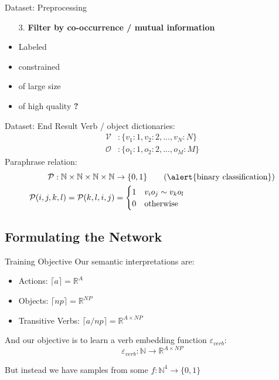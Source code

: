 \documentclass{beamer}
\begin{document}
\begin{frame}{Dataset: Preprocessing}

	\begin{enumerate}
	\item[3.] \textbf{Filter by co-occurrence / mutual information}
	\end{enumerate}

	\begin{itemize}
	\item Labeled \textcolor{Yes}{\checkmark}
	\item constrained \textcolor{Yes}{\checkmark}
	\item of large size \textcolor{Yes}{\checkmark}
	\item of high quality \textcolor{Maybe}{\textbf{?}}
	\end{itemize}
\end{frame}
    
\begin{frame}{Dataset: End Result}
	Verb / object dictionaries:
	\begin{align*}
	\mathcal{V}&: \{v_1: 1, v_2: 2, ..., v_N: N\}\\
	\mathcal{O}&: \{o_1: 1, o_2: 2, ..., o_M: M\}
	\end{align*}
	Paraphrase relation: 
	\begin{align*}
	\mathcal{P}: \mathbb{N} \times \mathbb{N} \times \mathbb{N} \times \mathbb{N} &\to \{0, 1\} \tag{\alert{binary classification}}\\
	\mathcal{P}(i,j,k,l) = \mathcal{P}(k,l,i,j)
	 &= \begin{cases}
	1 & v_i o_j \sim v_k o_l\\
	0 & \text{otherwise}\\
	\end{cases}
	\end{align*}	
\end{frame}
  
\subsection{Formulating the Network}

  \begin{frame}{Training Objective}
    Our semantic interpretations are:
  	\begin{itemize}
  	\item Actions: $ \lceil a \rceil = \mathbb{R}^{A}$
  	\item Objects: $ \lceil np \rceil = \mathbb{R}^{NP}$
  	\item Transitive Verbs: $\lceil a / np \rceil = \mathbb{R}^{A\times NP}$
  	\end{itemize}
  
  	And our objective is to learn a \alert{verb embedding function} 
  	$\varepsilon_{verb}$:
  	\[
  	\varepsilon_{verb}: \mathbb{N} \to \mathbb{R}^{A\times NP}
  	\]
  	
  	But instead we have samples from some $f: \mathbb{N}^4 \to \{0,1\}$ 
  	

  	
\end{frame}
\end{document}

